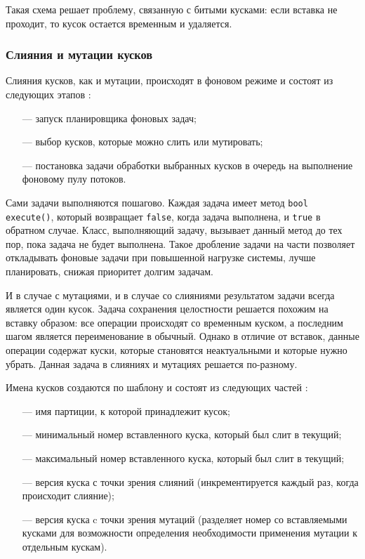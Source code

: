 Такая схема решает проблему, связанную с битыми кусками: если вставка не проходит, то кусок остается временным и удаляется.

\subsubsection{Слияния и мутации кусков}

Слияния кусков, как и мутации, происходят в фоновом режиме и состоят из следующих этапов \cite{backgroundproc}:
\begin{itemize}
	\item [---] запуск планировщика фоновых задач;
	\item [---] выбор кусков, которые можно слить или мутировать;
	\item [---] постановка задачи обработки выбранных кусков в очередь на выполнение фоновому пулу потоков.
\end{itemize}

Сами задачи выполняются пошагово. Каждая задача имеет метод \texttt{bool execute()}, который возвращает \texttt{false}, когда задача выполнена, и \texttt{true} в обратном случае. Класс, выполняющий задачу, вызывает данный метод до тех пор, пока задача не будет выполнена. Такое дробление задачи на части позволяет откладывать фоновые задачи при повышенной нагрузке системы, лучше планировать, снижая приоритет долгим задачам.

И в случае с мутациями, и в случае со слияниями результатом задачи всегда является один кусок. Задача сохранения целостности решается похожим на вставку образом: все операции происходят со временным куском, а последним шагом является переименование в обычный. Однако в отличие от вставок, данные операции содержат куски, которые становятся неактуальными и которые нужно убрать. Данная задача в слияниях и мутациях решается по-разному.

Имена кусков создаются по шаблону и состоят из следующих частей \cite{datapart}:
\begin{itemize}
	\item [---] имя партиции, к которой принадлежит кусок;
	\item [---] минимальный номер вставленного куска, который был слит в текущий;
	\item [---] максимальный номер вставленного куска, который был слит в текущий;
	\item [---] версия куска с точки зрения слияний (инкрементируется каждый раз, когда происходит слияние);
	\item [---] версия куска c точки зрения мутаций (разделяет номер со вставляемыми кусками для возможности определения необходимости применения мутации к отдельным кускам).
\end{itemize}

